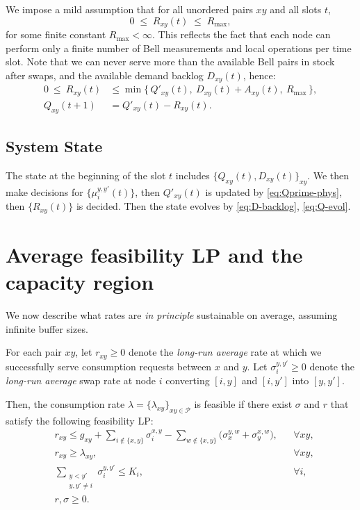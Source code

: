 \documentclass[11pt]{article}
\begin{document}
We impose a mild assumption that for all unordered pairs $xy$ and all slots $t$, 
\begin{equation}
0 \;\le\; R_{xy}(t)
\;\le\; R_{\max},
    \label{eq:Rmax}
\end{equation}
for some finite constant $R_{\max}<\infty$. This reflects the fact that each node can perform only a finite number of Bell measurements and local operations per time slot. Note that we can never serve more than the available Bell pairs in stock after swaps, and the available demand backlog $D_{xy}(t)$, hence:
\begin{align}
0\ \le\ R_{xy}(t)
&\le \min\Big\{\,Q'_{xy}(t),\ D_{xy}(t)+A_{xy}(t),\ R_{\max}\,\Big\}, \label{eq:R-box}\\
Q_{xy}(t{+}1)
&= Q'_{xy}(t) - R_{xy}(t).
\label{eq:Q-evol}
\end{align}



\subsection{System State}
The state at the beginning of the slot $t$ includes $\{Q_{xy}(t), D_{xy}(t)\}_{xy}$. We then make decisions for $\{\mu_i^{y,y'}(t)\}$, then $Q'_{xy}(t)$ is updated by \eqref{eq:Qprime-phys}, then $\{R_{xy}(t)\} $ is decided. Then the state evolves by \eqref{eq:D-backlog}, \eqref{eq:Q-evol}.




\section{Average feasibility LP and the capacity region}

We now describe what rates are \emph{in principle} sustainable on average, assuming infinite  buffer sizes.

For each pair $xy$, let $r_{xy}\ge 0$ denote the \emph{long-run average} rate at which we successfully serve consumption requests between $x$ and $y$. Let $\sigma_i^{y,y'}\ge 0$ denote the \emph{long-run average} swap rate at node $i$ converting $[i,y]$ and $[i,y']$ into $[y,y']$.

Then, the consumption rate $\lambda = \{\lambda_{xy}\}_{xy \in \mathcal{P}}$ is feasible if there exist $\sigma$ and $r$ that satisfy the following feasibility LP:
\begin{align}
& r_{xy} \le g_{xy}
+\sum_{i\notin\{x,y\}}\sigma_i^{x,y}
-\sum_{w\notin\{x,y\}}\big(\sigma_x^{y,w}+\sigma_y^{x,w}\big),
&& \forall xy,
\label{eq:Phard-balance}\\
&r_{xy} \ge \lambda_{xy}, && \forall xy,
\label{eq:Phard-demand}\\
&\sum_{\substack{y<y'\\ y,y'\neq i}}\sigma_i^{y,y'} \le K_i,
&& \forall i,
\label{eq:Phard-cap}\\
&r,\sigma \ge 0. \label{eq:sign}
\end{align}
\end{document}
